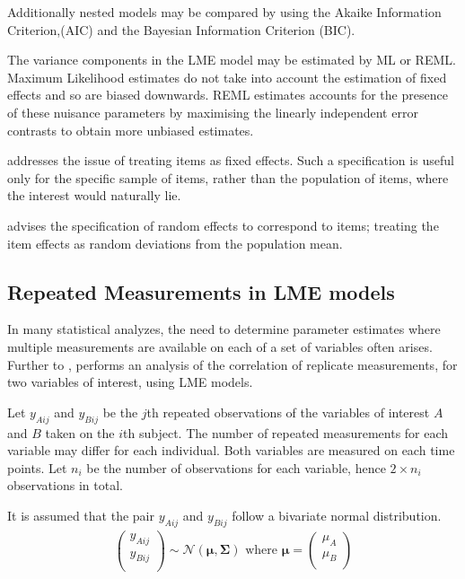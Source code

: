 \documentclass[12pt, a4paper]{report}
\theoremstyle{plain}
\theoremstyle{definition}
\theoremstyle{remark}
\begin{document}
	
	Additionally nested models may be compared by using the Akaike Information Criterion,(AIC) and the Bayesian Information Criterion (BIC).
	
	
	The variance components in the LME model may be estimated by ML or REML.
	Maximum Likelihood estimates do not take into account the estimation of fixed effects and so
	are biased downwards. REML estimates accounts for the presence of these nuisance parameters by maximising the linearly independent error contrasts to obtain more unbiased estimates.
	
	\citet{PB} addresses the issue of treating items as fixed effects. Such a specification is useful only for the specific sample of items, rather than the population of items, where the interest would naturally lie.
	
	\citet{PB} advises the specification of random effects to correspond to items; treating the item effects as random deviations from the population mean.
	
	
	
	
	
	
	\subsection{Repeated Measurements in LME models}
	
	In many statistical analyzes, the need to determine parameter estimates where multiple measurements are available on each of a set of variables often arises. Further to \citet{lam}, \citet{hamlett} performs an analysis of the correlation of replicate measurements, for two variables of interest, using LME models.
	
	Let $y_{Aij}$ and $y_{Bij}$ be the $j$th repeated observations of the variables of interest $A$ and $B$ taken on the $i$th subject. The number of repeated measurements for each variable may differ for each individual.
	Both variables are measured on each time points. Let $n_{i}$ be the number of observations for each variable, hence $2\times n_{i}$ observations in total.
	
	It is assumed that the pair $y_{Aij}$ and $y_{Bij}$ follow a bivariate normal distribution.
	\begin{eqnarray*}
		\left(
		\begin{array}{c}
			y_{Aij} \\
			y_{Bij} \\
		\end{array}
		\right) \sim \mathcal{N}(
		\boldsymbol{\mu}, \boldsymbol{\Sigma})\mbox{   where } \boldsymbol{\mu} = \left(
		\begin{array}{c}
			\mu_{A} \\
			\mu_{B} \\
		\end{array}
		\right)
	\end{eqnarray*}
	
\end{document}
